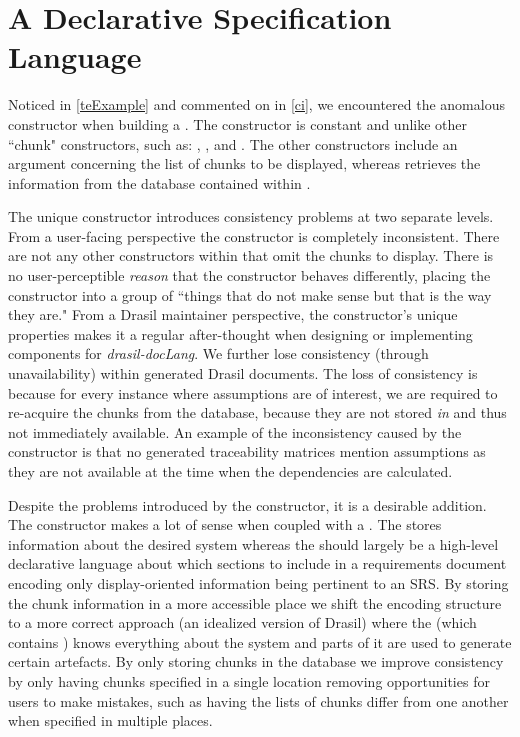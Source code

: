 \chapter{A Declarative Specification Language}\label{dl}
Noticed in \autoref{teExample} and commented on in \autoref{ci}, we encountered the anomalous constructor  when building a . The  constructor is constant and unlike other  ``chunk" constructors, such as: , , and . The other constructors include an argument concerning the list of chunks to be displayed, whereas  retrieves the information from the  database contained within .

The unique   constructor introduces consistency problems at two separate levels. From a user-facing perspective the constructor is completely inconsistent. There are not any other constructors within  that omit the chunks to display. There is no user-perceptible \textit{reason} that the  constructor behaves differently, placing the constructor into a group of ``things that do not make sense but that is the way they are." From a Drasil maintainer perspective, the constructor's unique properties makes it a regular after-thought when designing or implementing components for \textit{drasil-docLang}. We further lose consistency (through unavailability) within generated Drasil documents. The loss of consistency is because for every instance where assumptions are of interest, we are required to re-acquire the chunks from the database, because they are not stored \textit{in}  and thus not immediately available. An example of the inconsistency caused by the  constructor is that no generated traceability matrices mention assumptions as they are not available at the time when the dependencies are calculated.

Despite the problems introduced by the  constructor, it is a desirable addition. The constructor makes a lot of sense when coupled with a . The  stores information about the desired system whereas the  should largely be a high-level declarative language about which sections to include in a requirements document encoding only display-oriented information being pertinent to an SRS. By storing the chunk information in a more accessible place we shift the encoding structure to a more correct approach (an idealized version of Drasil) where the  (which contains ) knows everything about the system and parts of it are used to generate certain artefacts. By only storing chunks in the database we improve consistency by only having chunks specified in a single location removing opportunities for users to make mistakes, such as having the lists of chunks differ from one another when specified in multiple places.

